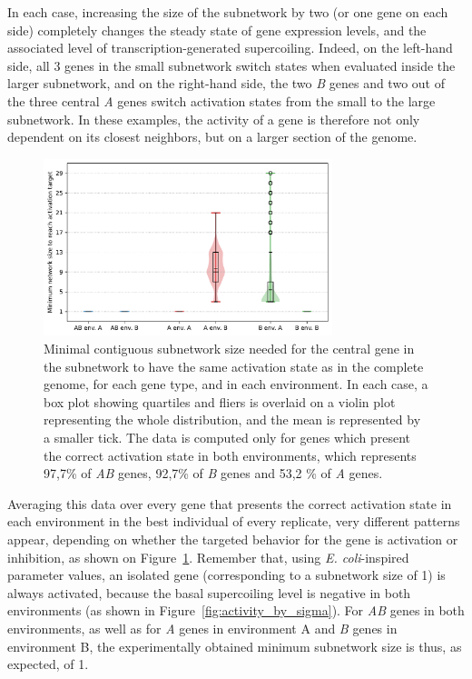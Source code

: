 In each case, increasing the size of the subnetwork by two (or one gene on each side) completely changes the steady state of gene expression levels, and the associated level of transcription-generated supercoiling.
Indeed, on the left-hand side, all 3 genes in the small subnetwork switch states when evaluated inside the larger subnetwork, and on the right-hand side, the two \emph{B} genes and two out of the three central \emph{A} genes switch activation states from the small to the large subnetwork.
In these examples, the activity of a gene is therefore not only dependent on its closest neighbors, but on a larger section of the genome.

\begin{figure}[H]
  \centering
  \includegraphics[width=0.75\textwidth]{ploscb/img/min_network_size.pdf}
  \caption{Minimal contiguous subnetwork size needed for the central gene in the subnetwork to have the same activation state as in the complete genome, for each gene type, and in each environment.
  In each case, a box plot showing quartiles and fliers is overlaid on a violin plot representing the whole distribution, and the mean is represented by a smaller tick.
  The data is computed only for genes which present the correct activation state in both environments, which represents 97,7\% of \emph{AB} genes, 92,7\% of \emph{B} genes and 53,2 \% of \emph{A} genes.}
  \label{fig:min_subnetwork}
\end{figure}

Averaging this data over every gene that presents the correct activation state in each environment in the best individual of every replicate, very different patterns appear, depending on whether the targeted behavior for the gene is activation or inhibition, as shown on Figure~\ref{fig:min_subnetwork}.
Remember that, using \emph{E. coli}-inspired parameter values, an isolated gene (corresponding to a subnetwork size of 1) is always activated, because the basal supercoiling level is negative in both environments (as shown in Figure~\ref{fig:activity_by_sigma}).
For \emph{AB} genes in both environments, as well as for \emph{A} genes in environment A and \emph{B} genes in environment B, the experimentally obtained minimum subnetwork size is thus, as expected, of 1.


